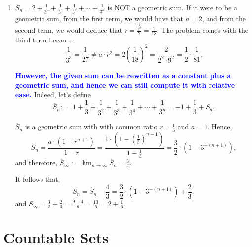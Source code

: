 \begin{enumerate}
\item $S_n = 2 + \frac{1}{3^2} + \frac{1}{3^3} + \frac{1}{3^4} + \cdots +\frac{1}{3^n} $ is NOT a geometric sum. If it were to be a geometric sum, from the first term, we would have that $a=2$, and from the second term, we would deduce that $r=\frac{\frac{1}{3^2}}{2} = \frac{1}{18}$. The problem comes with the third term because 
$$\frac{1}{3^3} = \frac{1}{27} \neq a \cdot r^2 = 2 \left(\frac{1}{18}\right)^2 = \frac{2}{2^2 \cdot 9^2} =  \frac{1}{2} \cdot  \frac{1}{81}.$$

\textcolor{blue}{\bf However, the given sum can be rewritten as a constant plus a geometric sum, and hence we can still compute it with relative ease.} Indeed, let's define 
$$ \overline{S}_n : =  1 + \frac{1}{3} + \frac{1}{3^2} + \frac{1}{3^3} + \frac{1}{3^4} + \cdots +\frac{1}{3^n} = -1 + \frac{1}{3} + S_n.$$

$\overline{S}_n$ is a geometric sum with with common ratio $r= \frac{1}{3}$ and $a=1$. Hence, 
$$\overline{S}_n =  \frac{a \cdot (1 - r^{n+1})}{1 - r} =  \frac{1 \cdot (1 - (\frac{1}{3})^{n+1})}{1 - \frac{1}{3}} =\frac{3}{2} \cdot \left( 1 - 3^{-(n+1)}  \right),$$ 
and therefore, $\overline{S}_\infty := \displaystyle \lim_{n \to \infty} \overline{S}_n = \frac{3}{2}$.

It follows that, 
$$S_n = \overline{S}_n - \frac{4}{3} = \frac{3}{2} \cdot \left( 1 - 3^{-(n+1)}  \right) + \frac{2}{3},$$
and $S_\infty = \frac{3}{2} + \frac{2}{3} = \frac{9 + 4}{6} = \frac{13}{6} = 2 + \frac{1}{6}$.

\end{enumerate}

\begin{center}
\setlength{\fboxrule}{3pt} 
\end{center}

\Qed


\section{Countable Sets}


